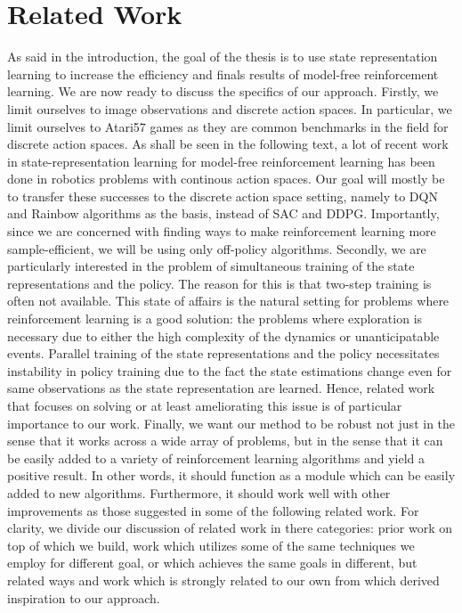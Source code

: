 \chapter{Related Work}
As said in the introduction, the goal of the thesis is to use
state representation learning to increase the efficiency 
and finals results of model-free reinforcement learning.
We are now ready to discuss the specifics of our approach.
Firstly, we limit ourselves to image observations and discrete action spaces.
In particular, we limit ourselves to Atari57 games as they are common benchmarks in the field
for discrete action spaces.
As shall be seen in the following text, a lot of recent work in state-representation learning
for model-free reinforcement learning has been done in robotics problems with 
continous action spaces. %
Our goal will mostly be to transfer these successes to the discrete action space setting,
namely to DQN and Rainbow algorithms as the basis, instead of SAC and DDPG.
Importantly, since we are concerned with finding ways to make  reinforcement learning
more sample-efficient, we will be using only off-policy algorithms.
Secondly, we are particularly interested in the problem of simultaneous training
of the state representations and the policy.
The reason for this is that two-step training is often not available.
This state of affairs is the natural setting for problems where reinforcement learning
is a good solution: the problems where exploration is necessary due to
either the high complexity of the dynamics or unanticipatable events.
Parallel training of the state representations and the policy necessitates
instability in policy training due to the fact the state estimations
change even for same observations as the state representation are learned.
Hence, related work that focuses on solving or at least ameliorating this issue 
is of particular importance to our work.
Finally, we want our method to be robust not just in the sense that it works
across a wide array of problems, but in the sense that it can be 
easily added to a variety of reinforcement learning algorithms
and yield a positive result. In other words, it should function as a module
which can be easily added to new algorithms.
Furthermore, it should work well with other improvements as those suggested
in some of the following related work.
For clarity, we divide our discussion of related work in there categories:
prior work on top of which we build, work which utilizes some of the same
techniques we employ for different goal, or which achieves the same goals
in different, but related ways and work which is strongly related to our own
from which derived inspiration to our approach.

